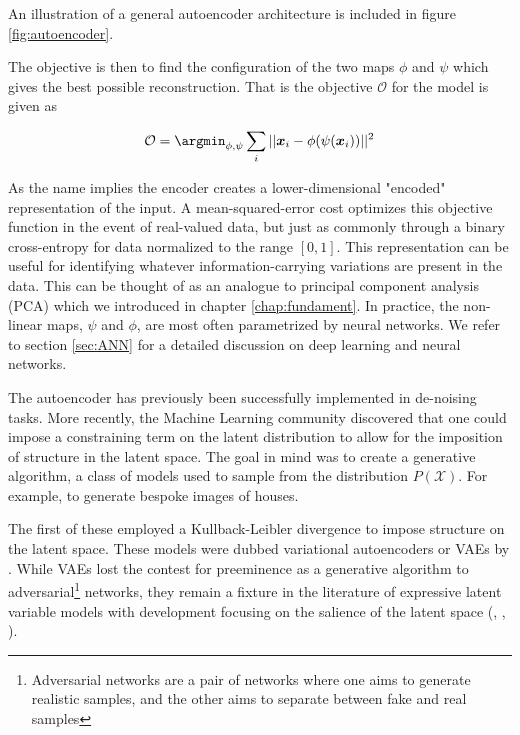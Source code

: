 \noindent An illustration of a general autoencoder architecture is included in figure \ref{fig:autoencoder}.

The objective is then to find the configuration of the two maps $\phi$ and $\psi$ which gives the best possible reconstruction. That is the objective $\mathcal{O}$ for the model is given as

\begin{align}\label{eq:objective_autoenc}
  \mathcal{O} = \argmin_{\phi, \psi} \sum_i || \boldsymbol{x}_i - \phi(\psi( \boldsymbol{x}_i ))  ||^2
\end{align}

\noindent  As the name implies the encoder creates a lower-dimensional "encoded" representation of the input. A mean-squared-error cost optimizes this objective function in the event of real-valued data, but just as commonly through a binary cross-entropy for data normalized to the range $[0, 1]$. This representation can be useful for identifying whatever information-carrying variations are present in the data. This can be thought of as an analogue to principal component analysis (PCA)\cite{Marsland2009} which we introduced in chapter \ref{chap:fundament}. In practice, the non-linear maps, $\psi$ and $\phi$, are most often parametrized by neural networks. We refer to section \ref{sec:ANN} for a detailed discussion on deep learning and neural networks.

The autoencoder has previously been successfully implemented in de-noising tasks. More recently, the Machine Learning community discovered that one could impose a constraining term on the latent distribution to allow for the imposition of structure in the latent space. The goal in mind was to create a generative algorithm, a class of models used to sample from the distribution $P(\mathcal{X})$. For example, to generate bespoke images of houses. 

The first of these employed a Kullback-Leibler divergence to impose structure on the latent space. These models were dubbed variational autoencoders or VAEs by \citet{Kingma2013}. While VAEs lost the contest for preeminence as a generative algorithm to adversarial\footnote{Adversarial networks are a pair of networks where one aims to generate realistic samples, and the other aims to separate between fake and real samples} networks, they remain a fixture in the literature of expressive latent variable models with development focusing on the salience of the latent space (\cite{Higgins2017}, \cite{Zhao}, \cite{Fertig}).

